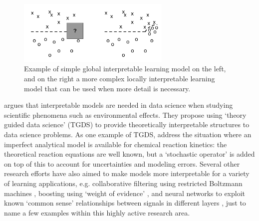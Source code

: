 \begin{figure}[htbp]
    \centering
    \includegraphics[width=0.65\textwidth]{Figures/global_local}
    \caption{Example of simple global interpretable learning model on the left, and on the right a more complex locally interpretable learning model that can be used when more detail is necessary.}
    \label{fig:ruping}
\end{figure}

\citet{Faghmous2014-og} argues that interpretable models are needed in data science when studying scientific phenomena such as environmental effects. They propose using `theory guided data science' (TGDS) to provide theoretically interpretable structures to data science problems. As one example of TGDS, \citet{Morrison2016-fz} address the situation where an imperfect analytical model is available for chemical reaction kinetics: the theoretical reaction equations are well known, but a `stochastic operator' is added on top of this to account for uncertainties and modeling errors. 
Several other research efforts have also aimed to make models more interpretable for a variety of learning applications, e.g. collaborative filtering using restricted Boltzmann machines \citet{Abdollahi2016-vn}, boosting using `weight of evidence' \citet{Ridgeway1998-lv}, and neural networks to exploit known `common sense' relationships between signals in different layers \citet{Choi2016-by}, just to name a few examples within this highly active research area. 

